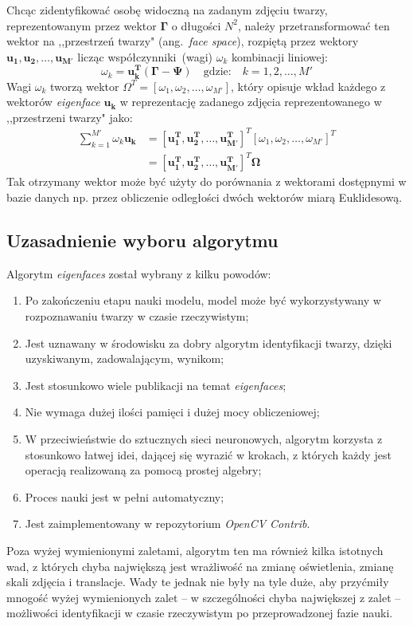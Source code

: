 \documentclass[a4paper,titlepage]{article}
\theoremstyle{break}
\numberwithin{equation}{subsection}
\begin{document}
Chcąc zidentyfikować osobę widoczną na zadanym zdjęciu twarzy, reprezentowanym przez wektor $\bm\Gamma$ o długości $N^2$, należy przetransformować ten wektor na ,,przestrzeń twarzy" (ang.~\emph{face space}), rozpiętą przez wektory~$\bm{u_1},\bm{u_2},\dotsc,\bm{u_{M'}}$ licząc współczynniki~(wagi) $\omega_k$ kombinacji liniowej:
\begin{equation}
	\omega_k=\bm{u_k^T}(\bm{\Gamma}-\bm{\Psi})\quad\text{gdzie:}\quad k=1,2,\dotsc,M'
\end{equation}
Wagi $\omega_k$ tworzą wektor $\Omega^T=[\omega_1,\omega_2,\dotsc,\omega_{M'}]$, który opisuje wkład każdego z wektorów \emph{eigenface} $\bm{u_k}$ w reprezentację zadanego zdjęcia reprezentowanego w ,,przestrzeni twarzy" jako:
\begin{equation}
\begin{split}
	\sum\limits_{k=1}^{M'}\omega_k\bm{u_k}&=[\bm{u_1^T},\bm{u_2^T},\dotsc,\bm{u_{M'}^T}]^T[\omega_1,\omega_2,\dotsc,\omega_{M'}]^T\\&=[\bm{u_1^T},\bm{u_2^T},\dotsc,\bm{u_{M'}^T}]^T\bm{\Omega}
\end{split}
\end{equation}
Tak otrzymany wektor może być użyty do porównania z wektorami dostępnymi w bazie danych np. przez obliczenie odległości dwóch wektorów miarą Euklidesową.


\subsection{Uzasadnienie wyboru algorytmu}

Algorytm \emph{eigenfaces} został wybrany z kilku powodów:
\begin{enumerate}
	\item Po zakończeniu etapu nauki modelu, model może być wykorzystywany w rozpoznawaniu twarzy w czasie rzeczywistym;
	\item Jest uznawany w środowisku za dobry algorytm identyfikacji twarzy, dzięki uzyskiwanym, zadowalającym, wynikom;
	\item Jest stosunkowo wiele publikacji na temat \emph{eigenfaces};
	\item Nie wymaga dużej ilości pamięci i dużej mocy obliczeniowej;
	\item W przeciwieństwie do sztucznych sieci neuronowych, algorytm korzysta z stosunkowo łatwej idei, dającej się wyrazić w krokach, z których każdy jest operacją realizowaną za pomocą prostej algebry;
	\item Proces nauki jest w pełni automatyczny;
	\item Jest zaimplementowany w repozytorium \emph{OpenCV Contrib}.
\end{enumerate}
Poza wyżej wymienionymi zaletami, algorytm ten ma również kilka istotnych wad, z których chyba największą jest wrażliwość na zmianę oświetlenia, zmianę skali zdjęcia i translacje. Wady te jednak nie były na tyle duże, aby przyćmiły mnogość wyżej wymienionych zalet -- w szczególności chyba największej z zalet -- możliwości identyfikacji w czasie rzeczywistym po przeprowadzonej fazie nauki.
\end{document}
